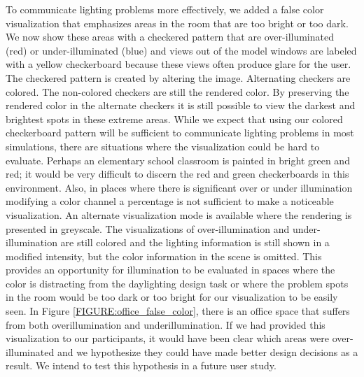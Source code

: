 \documentclass[10pt,twocolumn,letterpaper]{article}
\begin{document}
To communicate lighting problems more effectively, we added a
false color visualization that emphasizes areas in the room that are
too bright or too dark.  We now show these areas with a checkered
pattern that are over-illuminated (red) or under-illuminated (blue) and
views out of the model windows are labeled with a yellow checkerboard
because these views often produce glare for the user. The checkered
pattern is created by altering the image. 
%
%
Alternating checkers are colored.  The non-colored checkers are still the 
rendered color.  
%
By preserving the rendered color in the alternate checkers it is still
possible to view the darkest and brightest spots in these extreme areas.
While we expect that using our colored checkerboard pattern will be
sufficient to communicate lighting problems in most simulations, there
are situations where the visualization could be hard to evaluate.
Perhaps an elementary school classroom is painted in bright green and
red; it would be very difficult to discern the red and green
checkerboards in this environment.  Also, in places where there is
significant over or under illumination modifying a color channel a
percentage is not sufficient to make a noticeable visualization.  An
alternate visualization mode is available where the rendering is
presented in greyscale.  The visualizations of over-illumination
and under-illumination are still colored and the lighting information
is still shown in a modified intensity, but the color information in
the scene is omitted.  This provides an opportunity for illumination
to be evaluated in spaces where the color is distracting from the
daylighting design task or where the problem spots in the room would
be too dark or too bright for our visualization to be easily seen.
In Figure \ref{FIGURE:office_false_color}, there is an 
office space that suffers from both overillumination and underillumination.
If we had provided this visualization to our participants, it would
have been clear which areas were over-illuminated and we hypothesize
they could have made better design decisions as a result.  We intend
to test this hypothesis in a future user study.
\end{document}
